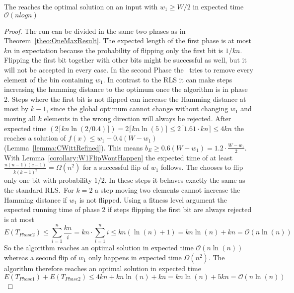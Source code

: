 \begin{lemma}
      The \RLSR[k=2] reaches the optimal solution on an input with $w_1\ge W/2$ in expected time $\mathcal{O}(nlogn)$
\end{lemma}
\begin{proof}
      The run can be divided in the same two phases as in Theorem~\ref{theo:OneMaxResult}.
      The expected length of the first phase is at most $kn$ in expectation because the probability of flipping only the first bit is $1/kn$.
      Flipping the first bit together with other bits might be successful as well, but it will not be accepted in every case.\newline
      In the second Phase the \RLSR~tries to remove every element of the bin containing $w_1$.
      In contrast to the RLS it can make steps increasing the hamming distance to the optimum once the algorithm is in phase 2.
      Steps where the first bit is not flipped can increase the Hamming distance at most by $k-1$, since the global optimum cannot change without changing $w_1$ and moving all $k$ elements in the wrong direction will always be rejected.
      After expected time $(2\lceil kn\ln(2/0.4)\rceil)=2\lceil kn\ln(5)\rceil\le2\lceil 1.61\cdot kn\rceil\le4kn$ the \RLSR[k] reaches a solution of \(f(x)\le w_1+0.4(W-w_1)\) (Lemma~\ref{lemma:CWittRefined}).
      This means \(b_E \ge 0.6(W-w_1) = 1.2\cdot\frac{W-w_1}{2}\).
      With Lemma~\ref{corollary:W1FlipWontHappen} the expected time of at least \(\frac{n(n-1)(c-1)}{k{(k-1)}^2}=\Omega(n^2)\) for a successful flip of $w_1$ follows.\newline
      The \RLSR[2] chooses to flip only one bit with probability $1/2$.
      In these steps it behaves exactly the same as the standard RLS.\
      For $k=2$ a step moving two elements cannot increase the Hamming distance if $w_1$ is not flipped.
      Using a fitness level argument the expected running time of phase 2 if steps flipping the first bit are always rejected is at most
      \[
            E(T_{Phase 2})
            \le \sum_{i=1}^{n}{\frac{kn}{i}}
            = kn\cdot\sum_{i=1}^{n}{i}
            \le kn(\ln(n)+1)
            = kn\ln(n)+kn
            = \mathcal{O}(n\ln(n))
      \]
      So the algorithm reaches an optimal solution in expected time $\mathcal{O}(n\ln(n))$ whereas a second flip of $w_1$ only happens in expected time $\Omega(n^2)$.
      The algorithm therefore reaches an optimal solution in expected time
      \[E(T_{Phase 1}) + E(T_{Phase 2})
            \le 4kn + kn\ln(n)+kn
            = kn\ln(n)+5kn
            = \mathcal{O}(n\ln(n))\]
\end{proof}

